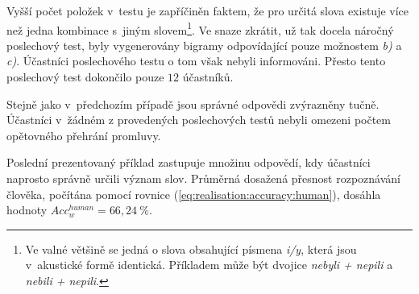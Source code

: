 Vyšší počet položek v~testu je zapříčiněn faktem, že pro určitá slova existuje více než jedna kombinace s~jiným slovem\footnote{Ve valné většině se jedná o slova obsahující písmena \textit{i/y}, která jsou v~akustické formě identická. Příkladem může být dvojice \textit{nebyli + nepili} a \textit{nebili + nepili}.}. Ve snaze zkrátit, už tak docela náročný poslechový test, byly vygenerovány bigramy odpovídající pouze možnostem \textit{b)} a \textit{c)}. Účastníci poslechového testu o tom však nebyli informováni. Přesto tento poslechový test dokončilo pouze $12$ účastníků.

Stejně jako v~předchozím případě jsou správné odpovědi zvýrazněny tučně.
Účastníci v~žádném z provedených poslechových testů nebyli omezeni počtem opětovného přehrání promluvy.

Poslední prezentovaný příklad zastupuje množinu odpovědí, kdy účastníci naprosto správně určili význam slov.
Průměrná dosažená přesnost rozpoznávání člověka, počítána pomocí rovnice (\ref{eq:realisation:accuracy:human}), dosáhla hodnoty $Acc_{w}^{human} = 66,24~\%$.

